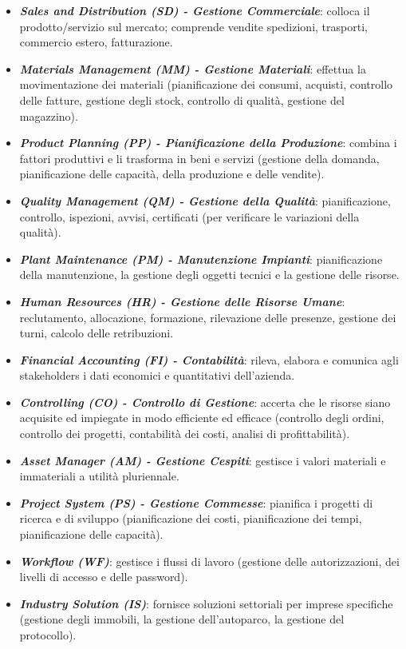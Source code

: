 \documentclass[a4paper, notitlepage, 9pt]{extreport}
\begin{document}
\begin{itemize}
	\item \textit{\textbf{Sales and Distribution (SD) - Gestione Commerciale}}: colloca il prodotto/servizio sul mercato; comprende vendite spedizioni, trasporti, commercio estero, fatturazione.
	\item \textit{\textbf{Materials Management (MM) - Gestione Materiali}}: effettua la movimentazione dei materiali (pianificazione dei consumi, acquisti, controllo delle fatture, gestione degli stock, controllo di qualità, gestione del magazzino).
	\item \textit{\textbf{Product Planning (PP) - Pianificazione della Produzione}}: combina i fattori produttivi e li trasforma in beni e servizi (gestione della domanda, pianificazione delle capacità, della produzione e delle vendite).
	\item \textit{\textbf{Quality Management (QM) - Gestione della Qualità}}: pianificazione, controllo, ispezioni, avvisi, certificati (per verificare le variazioni della qualità).
	\item \textit{\textbf{Plant Maintenance (PM) - Manutenzione Impianti}}: pianificazione della manutenzione, la gestione degli oggetti tecnici e la gestione delle risorse.
	\item \textit{\textbf{Human Resources (HR) - Gestione delle Risorse Umane}}: reclutamento, allocazione, formazione, rilevazione delle presenze, gestione dei turni, calcolo delle retribuzioni.
	\item \textit{\textbf{Financial Accounting (FI) - Contabilità}}: rileva, elabora e comunica agli stakeholders i dati economici e quantitativi dell’azienda.
	\item \textit{\textbf{Controlling (CO) - Controllo di Gestione}}: accerta che le risorse siano acquisite ed impiegate in modo efficiente ed efficace (controllo degli
	ordini, controllo dei progetti, contabilità dei costi, analisi di profittabilità).
	\item \textit{\textbf{Asset Manager (AM) - Gestione Cespiti}}: gestisce i valori materiali e immateriali a utilità pluriennale.
	\item \textit{\textbf{Project System (PS) - Gestione Commesse}}: pianifica i progetti di ricerca e di sviluppo (pianificazione dei costi, pianificazione dei tempi, pianificazione delle capacità).
	\item \textit{\textbf{Workflow (WF)}}: gestisce i flussi di lavoro (gestione delle autorizzazioni, dei livelli di accesso e delle password).
	\item \textit{\textbf{Industry Solution (IS)}}: fornisce soluzioni settoriali per imprese specifiche (gestione degli immobili, la gestione dell’autoparco, la gestione del protocollo).
\end{itemize}
\end{document}

